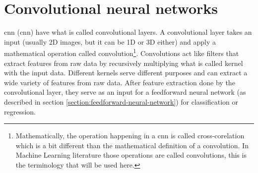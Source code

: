 \section{Convolutional neural networks}
\acrlong{cnn} (\acrshort{cnn}) have what is called convolutional layers. A convolutional layer takes an input (usually 2D images, but it can be 1D or 3D either) and apply a mathematical operation called convolution\footnote{Mathematically, the operation happening in a \acrshort{cnn} is called cross-corelation which is a bit different than the mathematical definition of a convolution. In Machine Learning literature those operations are called convolutions, this is the terminology that will be used here.}. Convolutions act like filters that extract features from raw data by recursively multiplying what is called kernel with the input data. Different kernels serve different purposes and can extract a wide variety of features from raw data. After feature extraction done by the convolutional layer, they serve as an input for a feedforward neural network (as described in section \ref{section:feedforward-neural-network}) for classification or regression.

